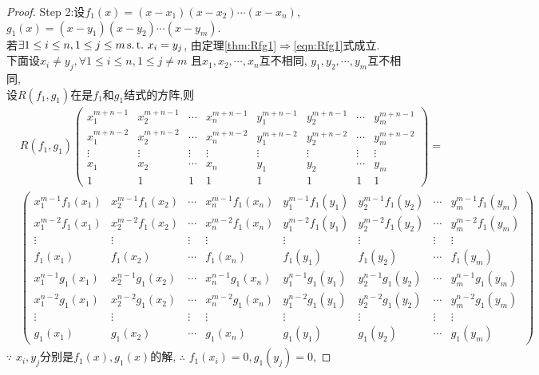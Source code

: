 \begin{proof}
  {\heiti Step 2}:设$f_1(x)=(x-x_1)(x-x_2)\cdots(x-x_n)$, 
  $g_1(x)=(x-y_1)(x-y_2)\cdots(x-y_m)$.\\
  若$\exists 1 \leq i \leq n, 1 \leq j \leq m \operatorname{s.t.{}} x_i=y_j$,
  由定理\ref{thm:Rfg1}$\Longrightarrow$\eqref{eqn:Rfg1}式成立.\\
  下面设$x_i\neq y_j, \forall 1 \leq i \leq n, 1 \leq j \neq m$
  且$x_1,x_2,\cdots,x_n$互不相同, $y_1,y_2,\cdots,y_m$互不相同,\\
  设$R(f_1,g_1)$在是$f_1$和$g_1$结式的方阵,则
  \begin{align*}
    &R(f_1,g_1)
    \begin{pmatrix}
    x_1^{m+n-1}&x_2^{m+n-1}&\cdots&x_n^{m+n-1}&y_1^{m+n-1}&y_2^{m+n-1}&\cdots&y_m^{m+n-1}\\
    x_1^{m+n-2}&x_2^{m+n-2}&\cdots&x_n^{m+n-2}&y_1^{m+n-2}&y_2^{m+n-2}&\cdots&y_m^{m+n-2}\\
    \vdots&\vdots&\vdots&\vdots&\vdots&\vdots&\vdots&\vdots\\
    x_1 & x_2 & \cdots & x_n & y_1 & y_2 & \cdots & y_m\\
    1 & 1 & 1 & 1 & 1 & 1 & 1 & 1
    \end{pmatrix}=\\
    &
       \begin{pmatrix}
         x_1^{m-1}f_1(x_1)&x_2^{m-1}f_1(x_2)&\cdots&x_n^{m-1}f_1(x_n)&y_1^{m-1}f_1(y_1)&y_2^{m-1}f_1(y_2)&\cdots&y_m^{m-1}f_1(y_m)\\
         x_1^{m-2}f_1(x_1)&x_2^{m-2}f_1(x_2)&\cdots&x_n^{m-2}f_1(x_n)&y_1^{m-2}f_1(y_1)&y_2^{m-2}f_1(y_2)&\cdots&y_m^{m-2}f_1(y_m)\\
         \vdots&\vdots&\vdots&\vdots&\vdots&\vdots&\vdots&\vdots\\
         f_1(x_1)&f_1(x_2)&\cdots&f_1(x_n)&f_1(y_1)&f_1(y_2)&\cdots&f_1(y_m)\\
         x_1^{n-1}g_1(x_1)&x_2^{n-1}g_1(x_2)&\cdots&x_n^{n-1}g_1(x_n)&y_1^{n-1}g_1(y_1)&y_2^{n-1}g_1(y_2)&\cdots&y_m^{n-1}g_1(y_m)\\
         x_1^{n-2}g_1(x_1)&x_2^{n-2}g_1(x_2)&\cdots&x_n^{m-2}g_1(x_n)&y_1^{n-2}g_1(y_1)&y_2^{n-2}g_1(y_2)&\cdots&y_m^{n-2}g_1(y_m)\\
         \vdots&\vdots&\vdots&\vdots&\vdots&\vdots&\vdots&\vdots\\
         g_1(x_1)&g_1(x_2)&\cdots&g_1(x_n)&g_1(y_1)&g_1(y_2)&\cdots&g_1(y_m)
       \end{pmatrix}
  \end{align*}
  $\because$ $x_i, y_j$分别是$f_1(x),g_1(x)$的解, $\therefore$ $f_1(x_i)=0, g_1(y_j)=0$,

\end{proof}
